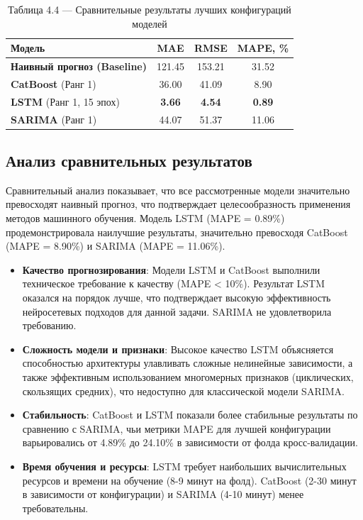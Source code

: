 \begin{table}[H]
	\centering
	\caption*{Таблица 4.4 --- Сравнительные результаты лучших конфигураций моделей}
	\begin{tabular}{|l|c|c|c|}
		\hline
		\textbf{Модель} & \textbf{MAE} & \textbf{RMSE} & \textbf{MAPE, \%} \\
		\hline
        \textbf{Наивный прогноз (Baseline)} & 121.45 & 153.21 & 31.52 \\
        \hline
		\textbf{CatBoost} (Ранг 1) & 36.00 & 41.09 & 8.90 \\
		\hline
		\textbf{LSTM} (Ранг 1, 15 эпох) & \textbf{3.66} & \textbf{4.54} & \textbf{0.89} \\
		\hline
		\textbf{SARIMA} (Ранг 1) & 44.07 & 51.37 & 11.06 \\
		\hline
	\end{tabular}
	\label{tab:comparison_results}
\end{table}

\subsection{Анализ сравнительных результатов}

Сравнительный анализ показывает, что все рассмотренные модели значительно превосходят наивный прогноз, что подтверждает целесообразность применения методов машинного обучения. Модель LSTM (MAPE = 0.89\%) продемонстрировала наилучшие результаты, значительно превосходя CatBoost (MAPE = 8.90\%) и SARIMA (MAPE = 11.06\%).

\begin{itemize}
    \item \textbf{Качество прогнозирования}: Модели LSTM и CatBoost выполнили техническое требование к качеству (MAPE < 10\%). Результат LSTM оказался на порядок лучше, что подтверждает высокую эффективность нейросетевых подходов для данной задачи. SARIMA не удовлетворила требованию.
    
    \item \textbf{Сложность модели и признаки}: Высокое качество LSTM объясняется способностью архитектуры улавливать сложные нелинейные зависимости, а также эффективным использованием многомерных признаков (циклических, скользящих средних), что недоступно для классической модели SARIMA.
    
    \item \textbf{Стабильность}: CatBoost и LSTM показали более стабильные результаты по сравнению с SARIMA, чьи метрики MAPE для лучшей конфигурации варьировались от 4.89\% до 24.10\% в зависимости от фолда кросс-валидации.
    
    \item \textbf{Время обучения и ресурсы}: LSTM требует наибольших вычислительных ресурсов и времени на обучение (8-9 минут на фолд). CatBoost (2-30 минут в зависимости от конфигурации) и SARIMA (4-10 минут) менее требовательны.
\end{itemize}

